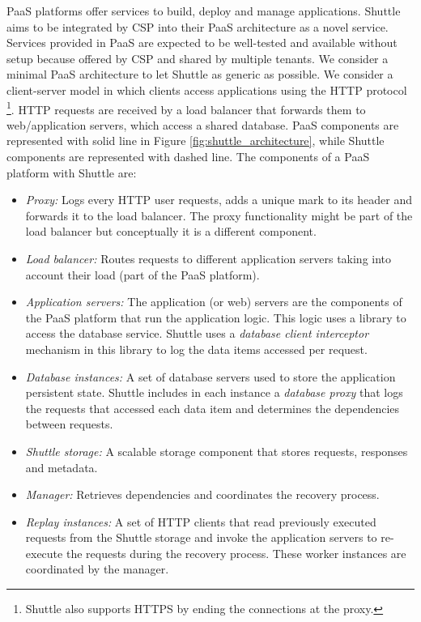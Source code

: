 \ac{PaaS} platforms offer services to build, deploy and manage applications. Shuttle aims to be integrated by \acf{CSP} into their \ac{PaaS} architecture as a novel service. Services provided in \ac{PaaS} are expected to be well-tested and available without setup because offered by \ac{CSP} and shared by multiple tenants.
We consider a minimal \ac{PaaS} architecture to let Shuttle as generic as possible. We consider a client-server model in which clients access applications using the HTTP protocol \footnote{Shuttle also supports HTTPS by ending the connections at the proxy.}. HTTP requests are received by a load balancer that forwards them to web/application servers, which access a shared database. {PaaS} components are represented with solid line in Figure \ref{fig:shuttle_architecture}, while Shuttle components are represented with dashed line. The components of a \ac{PaaS} platform with Shuttle are:

\begin{itemize}
  \item \textit{Proxy:} Logs every HTTP user requests, adds a unique mark to its header and forwards it to the load balancer. The proxy functionality might be part of the load balancer but conceptually it is a different component.%
  \item \textit{Load balancer:} Routes requests to different application servers taking into account their load (part of the \ac{PaaS} platform).
  \item \textit{Application servers:} The application (or web) servers are the components of the \ac{PaaS} platform that run the application logic. This logic uses a library to access the database service. Shuttle uses a \textit{database client interceptor} mechanism in this library to log the data items accessed per request.
  \item \textit{Database instances:} A set of database servers used to store the application persistent state. Shuttle includes in each instance  a \textit{database proxy} that logs the requests that accessed each data item and determines the dependencies between requests.
  \item \textit{Shuttle storage:} A scalable storage component that stores requests, responses and metadata.
  \item \textit{Manager:} Retrieves dependencies and coordinates the recovery process. 
  \item \textit{Replay instances:} A set of HTTP clients that read previously executed requests from the Shuttle storage and invoke the application servers to re-execute the requests during the recovery process. These worker instances are coordinated by the manager.
\end{itemize}

